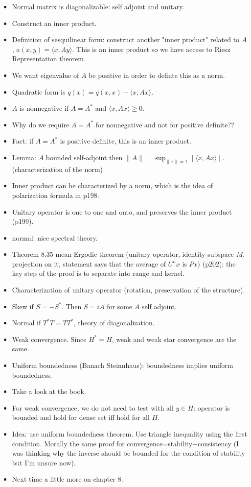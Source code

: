 \documentclass{article}
\theoremstyle{remark}
\begin{document}
\begin{itemize}
\item Normal matrix is diagonalizable: self adjoint and unitary.
\item Construct an inner product.
\item Definition of sesquilinear form: construct another "inner product" related to $A$, $a(x,y)=\langle x,Ay\rangle$. This is an inner product so we have access to Riesz Representation theorem.
\item We want eigenvalue of $A$ be positive in order to definte this as a norm.
\item Quadratic form is $q(x)=q(x,x)-\langle x,Ax\rangle$.
\item $A$ is nonnegative if $A=A^*$ and $\langle x,Ax\rangle\geq 0$.
\item Why do we require $A=A^*$ for nonnegative and not for positive definite??
\item Fact:  if $A=A^*$ is positive definite, this is an inner product.
\item Lemma: $A$ bounded self-adjoint then $\lVert A\rVert=\sup_{\lVert x\rVert=1}\mid\langle x,Ax\rangle\mid$. (characterization of the norm)
\item Inner product can be characterized by a norm, which is the idea of polarization formula in p198.
\item Unitary operator is one to one and onto, and preserves the inner product (p199).
\item normal: nice spectral theory.
\item Theorem 8.35 mean Ergodic theorem (unitary operator, identity subspace $M$, projection on it, statement says that the average of $U^n x$ is $Px$) (p202); the key step of the proof is to separate into range and kernel.






\item Characterization of unitary operator (rotation, preservation of the structure).
\item Skew if $S=-S^*$. Then $S=iA$ for some $A$ self adjoint.
\item Normal if $T^*T=TT^*$, theory of diagonalization.
\item Weak convergence. Since $H^*=H$, weak and weak star convergence are the same.
\item Uniform boundedness (Banach Steinnhaus): boundedness implies uniform boundedness.
\item Take a look at the book.
\item For weak convergence, we do not need to test with all $y\in H$: operator is bounded and hold for dense set iff hold for all $H$.
\item Idea: use uniform boundedness theorem. Use triangle inequality using the first condition. Morally the same proof for convergence=stability+consistency (I was thinking why the inverse should be bounded for the condition of stability but I'm unsure now).
\item Next time a little more on chapter 8.






\end{itemize}
\end{document}
